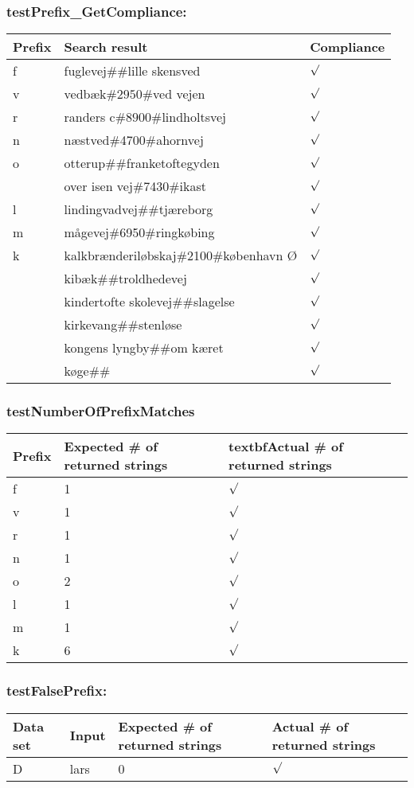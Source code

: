 \subsubsection*{testPrefix\_GetCompliance:}
\begin{tabular}{ p{1cm} | p{8cm} | p{1cm} }
	\textbf{Prefix} & \textbf{Search result} & \textbf{\textbf{Compliance}} \\
	\hline
	f & fuglevej$\#\#$lille skensved & $\surd$ \\
	v & vedb\ae k$\#2950\#$ved vejen & $\surd$ \\
	r & randers c$\#8900\#$lindholtsvej & $\surd$ \\
	n & n\ae stved$\#$4700$\#$ahornvej & $\surd$ \\
	o & otterup$\#\#$franketoftegyden & $\surd$ \\
	  & over isen vej$\#$7430$\#$ikast & $\surd$ \\
	l & lindingvadvej$\#\#$tj\ae reborg & $\surd$ \\
	m & m\aa gevej$\#$6950$\#$ringk\o bing & $\surd$ \\
	k & kalkbr\ae nderil\o bskaj$\#$2100$\#$k\o benhavn \O & $\surd$ \\
	  & kib\ae k$\#\#$troldhedevej & $\surd$ \\
	  & kindertofte skolevej$\#\#$slagelse & $\surd$ \\
	  & kirkevang$\#\#$stenl\o se & $\surd$ \\
	  & kongens lyngby$\#\#$om k\ae ret & $\surd$ \\
	  & k\o ge$\#\#$ & $\surd$ \\
\end{tabular}

\subsubsection*{testNumberOfPrefixMatches}
\begin{tabular}{ p{1cm} | p{2cm} | p{2cm} }
	\textbf{Prefix} & \textbf{Expected \# of returned strings} & textbf{Actual \# of returned strings} \\
	\hline
	f & 1 & $\surd$ \\
	v & 1 & $\surd$ \\
	r & 1 & $\surd$ \\
	n & 1 & $\surd$ \\
	o & 2 & $\surd$ \\
    l & 1 & $\surd$ \\
    m & 1 & $\surd$ \\
    k & 6 & $\surd$ \\
\end{tabular}

\subsubsection*{testFalsePrefix:}
\begin{tabular}{ p{1.5cm} | p{1.5cm} | p{3cm} | p{3cm} }
	\textbf{Data set} & \textbf{Input} & \textbf{Expected  \# of returned strings} & \textbf{Actual \# of returned strings} \\	
	\hline
	D & lars & 0 & $\surd$
\end{tabular}